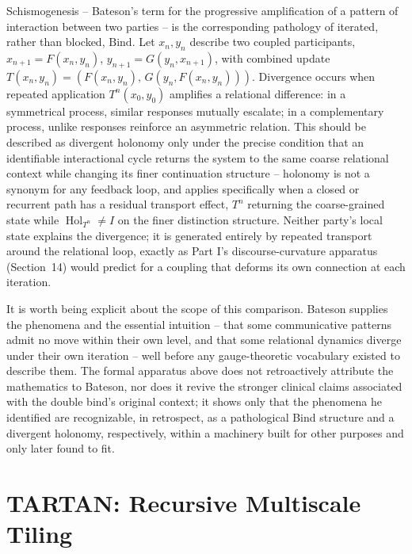 \documentclass[11pt]{article}
\newcommand{\Hol}{\operatorname{Hol}}
\newcommand{\Bind}{\mathrm{Bind}}
\begin{document}
Schismogenesis -- Bateson's term for the progressive amplification of a pattern of interaction between two parties -- is the corresponding pathology of iterated, rather than blocked, $\Bind$. Let $x_n, y_n$ describe two coupled participants, $x_{n+1} = F(x_n, y_n)$, $y_{n+1} = G(y_n, x_{n+1})$, with combined update $T(x_n,y_n) = (F(x_n,y_n),\, G(y_n, F(x_n,y_n)))$. Divergence occurs when repeated application $T^n(x_0,y_0)$ amplifies a relational difference: in a symmetrical process, similar responses mutually escalate; in a complementary process, unlike responses reinforce an asymmetric relation. This should be described as divergent holonomy only under the precise condition that an identifiable interactional cycle returns the system to the same coarse relational context while changing its finer continuation structure -- holonomy is not a synonym for any feedback loop, and applies specifically when a closed or recurrent path has a residual transport effect, $T^n$ returning the coarse-grained state while $\Hol_{T^n} \neq I$ on the finer distinction structure. Neither party's local state explains the divergence; it is generated entirely by repeated transport around the relational loop, exactly as Part I's discourse-curvature apparatus (Section~14) would predict for a coupling that deforms its own connection at each iteration.

It is worth being explicit about the scope of this comparison. Bateson supplies the phenomena and the essential intuition -- that some communicative patterns admit no move within their own level, and that some relational dynamics diverge under their own iteration -- well before any gauge-theoretic vocabulary existed to describe them. The formal apparatus above does not retroactively attribute the mathematics to Bateson, nor does it revive the stronger clinical claims associated with the double bind's original context; it shows only that the phenomena he identified are recognizable, in retrospect, as a pathological Bind structure and a divergent holonomy, respectively, within a machinery built for other purposes and only later found to fit.

\section{TARTAN: Recursive Multiscale Tiling}
\label{sec:tartan}
\end{document}
